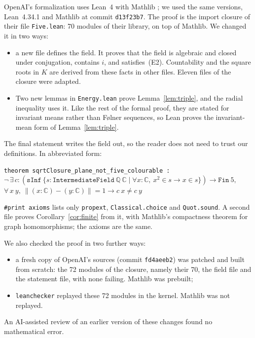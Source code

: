 \documentclass[11pt,a4paper]{amsart}
\theoremstyle{remark}
\newcommand{\C}{\mathbb{C}}
\newcommand{\Q}{\mathbb{Q}}
\begin{document}
OpenAI's formalization \cite{OpenAI} uses Lean~4 \cite{Lean4} with Mathlib \cite{Mathlib}; we used the same versions,
Lean~4.34.1 and Mathlib at commit \texttt{d13f23b7}. The proof is the import closure of their file
\texttt{Five.lean}: 70 modules of their library, on top of Mathlib. We changed it in two ways:
\begin{itemize}
\item a new file defines the field. It proves that the field is algebraic and closed under conjugation, contains $i$,
and satisfies~(E2). Countability and the square roots in $K$ are derived from these facts in other files. Eleven
files of the closure were adapted.
\item Two new lemmas in \texttt{Energy.lean} prove Lemma~\ref{lem:triple}, and the radial inequality uses it. Like
the rest of the formal proof, they are stated for invariant means rather than F{\o}lner sequences, so Lean proves the
invariant-mean form of Lemma~\ref{lem:triple}.
\end{itemize}
The final statement writes the field out, so the reader does not need to trust our definitions. In abbreviated form:
\begin{flushleft}\small
\texttt{theorem sqrtClosure\_plane\_not\_five\_colourable :}\\
\quad$\neg\,\exists\,c : (\mathtt{sInf}\ \{s : \mathtt{IntermediateField}\ \Q\ \C \mid
\forall x : \C,\ x^{2}\in s \to x\in s\}) \to \mathtt{Fin}\ 5,$\\
\qquad$\forall\,x\ y,\ \|(x:\C)-(y:\C)\| = 1 \to c\ x \ne c\ y$
\end{flushleft}
\verb|#print axioms| lists only \texttt{propext}, \texttt{Classical.choice} and \texttt{Quot.sound}. A second file
proves Corollary~\ref{cor:finite} from it, with Mathlib's compactness theorem for graph homomorphisms; the axioms are
the same.

We also checked the proof in two further ways:
\begin{itemize}
\item a fresh copy of OpenAI's sources (commit \texttt{fd4aeeb2}) was patched and built from scratch: the 72 modules
of the closure, namely their 70, the field file and the statement file, with none failing. Mathlib was prebuilt;
\item \texttt{leanchecker} replayed these 72 modules in the kernel. Mathlib was not replayed.
\end{itemize}
An AI-assisted review of an earlier version of these changes found no mathematical error.
\end{document}
